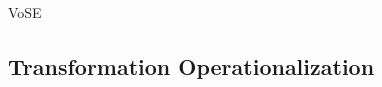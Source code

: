 \begin{copiedFrom}{VoSE}

\subsection*{Transformation Operationalization}
\label{chap:commonalities:approach:operationalization}


\end{copiedFrom}
